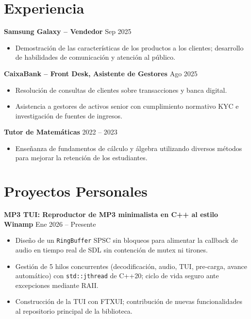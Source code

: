 \documentclass[11pt, a4paper]{article}
\begin{document}
\section{Experiencia}

\textbf{Samsung Galaxy -- Vendedor} \hfill Sep 2025
\begin{itemize}
    \item Demostración de las características de los productos a los clientes; desarrollo de habilidades de comunicación y atención al público.
\end{itemize}

\vspace{0.8em}

\textbf{CaixaBank -- Front Desk, Asistente de Gestores} \hfill Ago 2025
\begin{itemize}
    \item Resolución de consultas de clientes sobre transacciones y banca digital.
    \item Asistencia a gestores de activos senior con cumplimiento normativo KYC e investigación de fuentes de ingresos.
\end{itemize}

\vspace{0.8em}

\textbf{Tutor de Matemáticas} \hfill 2022 -- 2023
\begin{itemize}
    \item Enseñanza de fundamentos de cálculo y álgebra utilizando diversos métodos para mejorar la retención de los estudiantes.
\end{itemize}

\section{Proyectos Personales}

\textbf{MP3 TUI: Reproductor de MP3 minimalista en C++ al estilo Winamp} \hfill Ene 2026 -- Presente
\begin{itemize}
    \item Diseño de un \texttt{RingBuffer} SPSC sin bloqueos para alimentar la callback de audio en tiempo real de SDL sin contención de mutex ni tirones.
    \item Gestión de 5 hilos concurrentes (decodificación, audio, TUI, pre-carga, avance automático) con \texttt{std::jthread} de C++20; ciclo de vida seguro ante excepciones mediante RAII.
    \item Construcción de la TUI con FTXUI; contribución de nuevas funcionalidades al repositorio principal de la biblioteca.
\end{itemize}
\end{document}
